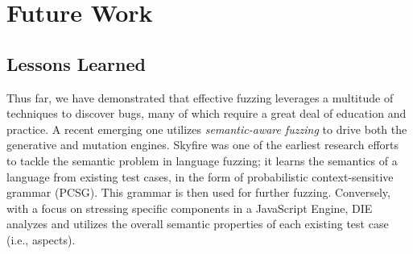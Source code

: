 \section{Future Work}

\subsection{Lessons Learned}
Thus far, we have demonstrated that effective fuzzing leverages a multitude of techniques 
to discover bugs, many of which require a great deal of education and practice. A recent emerging one utilizes
\textit{semantic-aware fuzzing} to drive both the generative and mutation engines.
%
Skyfire\cite{skyfire_2017} was one of the earliest research efforts to tackle the semantic problem in language 
fuzzing; it learns the semantics of a language from existing test cases, in the form of probabilistic 
context-sensitive grammar (PCSG). This grammar is then used for further fuzzing. Conversely, with a focus on 
stressing specific components in a JavaScript Engine, DIE\cite{die_2020} analyzes and utilizes the overall 
semantic properties of each existing test case (i.e., aspects).
%
% 
